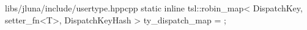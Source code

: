 \begin{fileminted}{libs/jluna/include/usertype.hpp}{cpp}
static inline tsl::robin_map<
    DispatchKey, setter_fn<T>, 
    DispatchKeyHash
> ty_dispatch_map = {};
\end{fileminted}
            